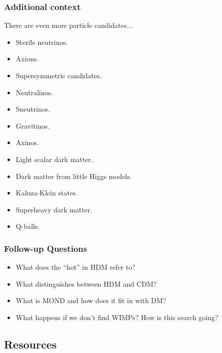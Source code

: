 \documentclass[a4paper,11pt]{article}
\begin{document}
\subsubsection{Additional context}

{\noindent}There are even more particle candidates...

\begin{itemize}
    \item Sterile neutrinos.
    \item Axions. 
    \item Supersymmetric candidates.
        \item Neutralinos.
        \item Sneutrinos.
        \item Gravitinos.
        \item Axinos.
    \item Light scalar dark matter.
    \item Dark matter from little Higgs models.
    \item Kaluza-Klein states.
    \item Superheavy dark matter.
    \item Q-balls.
\end{itemize}

\subsubsection{Follow-up Questions}

\begin{itemize}
    \item What does the ``hot'' in HDM refer to?
    \item What distinguishes between HDM and CDM?
    \item What is MOND and how does it fit in with DM?
    \item What happens if we don't find WIMPs? How is this search going?
\end{itemize}


\newpage
\subsection{Resources}
\end{document}
